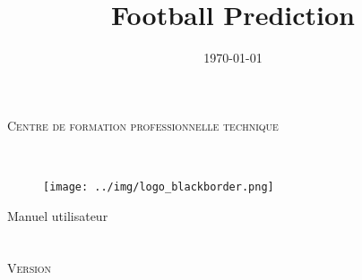 \documentclass[a4paper,14pt]{extarticle}
\title{Football Prediction}
\author{\vhListAllAuthorsLongWithAbbrev}
\date{\today}
\begin{document}
  \begin{titlepage}
  \centering
      {\large \textsc{Centre de formation professionnelle technique}}\\
    \vspace{2cm}
    
    \vfill
       {\LARGE \textbf{\@title}} \\
    \vspace{1cm}
    \begin{figure}[H]
        \centering
        \texttt{[image: ../img/logo\_blackborder.png]}
    \end{figure}
    \vspace{1cm}
        { \LARGE Manuel utilisateur}\\
    \vspace{2em}
        {\large \textbf{\@author}} \\
    \vspace{6em}
        {\large \@date}\\
    \vspace{1cm}
        {\large \textsc{Version \vhCurrentVersion}} \\
    \vfill
  \end{titlepage}
\makeatother

\newpage

\tableofcontents
\end{document}
